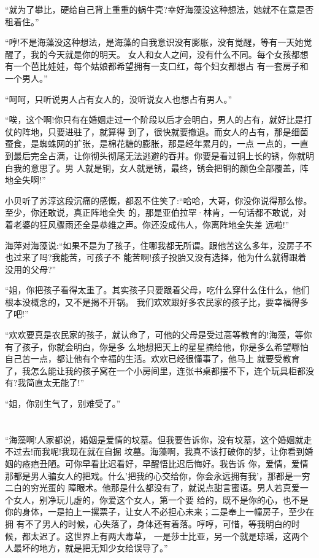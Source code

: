 \documentclass[11pt,a4paper,onecolumn]{article}
\begin{document}
``就为了攀比，硬给自己背上重重的蜗牛壳?幸好海藻没这种想法，她就不在意是否租着住。''

``哼!不是海藻没这种想法，是海藻的自我意识没有膨胀，没有觉醒，等有一天她觉醒了，我的今天就是你的明天。
女人和女人之间，没有什么不同。每个女孩都想有一个芭比娃娃，每个姑娘都希望拥有一支口红，每个妇女都想占
有一套房子和一个男人。''

``呵呵，只听说男人占有女人的，没听说女人也想占有男人。''

``唉，这个啊!你只有在婚姻走过一个阶段以后才会明白，男人的占有，就好比是打仗的阵地，只要进驻了，就算得
到了，很快就要撤退。而女人的占有，那是细菌蚕食，是蜘蛛网的扩张，是棉花糖的膨胀，那是经年累月的，一点
一点的，一直到最后完全占满，让你彻头彻尾无法逃避的吞并。你要是看过铜上长的锈，你就明白我的意思了。男
人就是铜，女人就是锈，最终，锈会把铜的颜色全部覆盖，阵地全失啊!''

小贝听了苏淳这段沉痛的感慨，都忍不住笑了:``哈哈，大哥，你没你说得那么惨。至少，你还敢说，真正阵地全失
的，那是亚伯拉罕·林肯，一句话都不敢说，对着老婆的狂风骤雨还全是恭维之声。你还没成伟人，你离阵地全失差
远啦!''

海萍对海藻说:``如果不是为了孩子，住哪我都无所谓。跟他苦这么多年，没房子不也过来了吗?我能苦，可孩子不
能苦啊!孩子投胎又没有选择，他为什么就得跟着没用的父母?''

``姐，你把孩子看得太重了。其实孩子只要跟着父母，吃什么穿什么住什么，他们根本没概念的，又不是揭不开锅。
我们欢欢跟好多农民家的孩子比，要幸福得多了吧!''

``欢欢要真是农民家的孩子，就认命了，可他的父母是受过高等教育的!海藻，等你有了孩子，你就会明白，你是多
么地想把天上的星星摘给他，你是多么希望哪怕自己苦一点，都让他有个幸福的生活。欢欢已经很懂事了，他马上
就要受教育了，我怎么能让我的孩子窝在一个小房间里，连张书桌都摆不下，连个玩具柜都没有?我简直太无能了!''

``姐，你别生气了，别难受了。''

\section[\thesection]{}

``海藻啊!人家都说，婚姻是爱情的坟墓。但我要告诉你，没有坟墓，这个婚姻就走不过去!而我呢!我现在就在自掘
坟墓。海藻啊，我真不该打破你的梦，让你看到婚姻的疮疤丑陋。可你早看比迟看好，早醒悟比迟后悔好。我告诉
你，爱情，爱情那都是男人骗女人的把戏。什么'把我的心交给你，你会永远拥有我'，那都是一穷二白的穷光蛋的
障眼术。他那是什么都没有了，就说点甜言蜜语。男人若真爱一个女人，别净玩儿虚的，你爱这个女人，第一个要
给的，既不是你的心，也不是你的身体，一是拍上一摞票子，让女人不必担心未来；二是奉上一幢房子，至少在拥
有不了男人的时候，心失落了，身体还有着落。哼哼，可惜，等我明白的时候，都太迟了。这世界上有两大毒草，
一是莎士比亚，另一个就是琼瑶，这两个人最坏的地方，就是把无知少女给误导了。''
\end{document}
